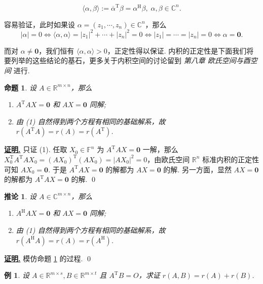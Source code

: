 \documentclass[10pt,openany]{article}
\theoremstyle{thmstyle} %
\theoremstyle{defstyle} %
\newtheorem{corollary}[theorem]{推论}
\theoremstyle{prostyle} %
\newtheorem{proposition}[theorem]{命题}
\theoremstyle{exastyle}
\newtheorem{example}[theorem]{例}
\theoremstyle{remstyle}
\renewenvironment{proof}[1][证明]{\par\underline{\textbf{#1.}} \;\fangsong}{\qed\par}
\newcommand{\T}{^{\text{T}}}
\newcommand{\Her}{^{\text{H}}}
\newcommand{\F}{\mathbb{F}}
\newcommand{\C}{\mathbb{C}}
\newcommand{\R}{\mathbb{R}}
\newcommand{\mn}{^{m \times n}}
\begin{document}
\[ \langle \alpha,\beta \rangle:= \overline{\alpha}\T \beta= \alpha\Her \beta, \; \alpha,\beta \in \C^n. \]

容易验证，此时如果设 \( \alpha=(z_1,\cdots,z_n) \in \C^n \)，那么 
\[ |\alpha|=0 \Leftrightarrow \langle \alpha,\alpha \rangle=|z_1|^2+\cdots+|z_n|^2=0 \Leftrightarrow |z_1|=\cdots=|z_n|=0 \Leftrightarrow \alpha=\bm{0}. \]

而对 \( \alpha \neq \bm{0} \)，我们恒有 \( \langle \alpha,\alpha \rangle>0 \)，正定性得以保证. 内积的正定性是下面我们将要列举的这些结论的基石，更多关于内积空间的讨论留到 \emph{第八章 欧氏空间与酉空间} 进行.


\begin{proposition} \label{5.3.9}
	设 \( A \in \R\mn \)，那么
	\begin{enumerate}[(1)]
		\item \( A\T AX=\bm{0} \) 和 \( AX=\bm{0} \) 同解;
		\item 由 (1) 自然得到两个方程有相同的基础解系，故 \( r(A\T A)=r(A)=r(A\T) \).
	\end{enumerate}
\end{proposition}


\begin{proof}
	只证 (1). 任取 \( X_0 \in \F^n \) 为 \( A\T AX=\bm{0} \) 一解，那么 \( X_0\T A\T AX_0=(AX_0)\T (AX_0)=|AX_0|^2=0 \)，由欧氏空间 \( \R^n \) 标准内积的正定性可知 \( AX_0=\bm{0} \). 于是 \( A\T AX=\bm{0} \) 的解都为 \( AX=\bm{0} \) 的解. 另一方面，显然 \( AX=\bm{0} \) 的解都为 \( A\T AX=\bm{0} \) 的解.
\end{proof}


\begin{corollary} \label{5.3.10}
	设 \( A \in \C\mn \)，那么
	\begin{enumerate}[(1)]
		\item \( A\Her AX=\bm{0} \) 和 \( AX=\bm{0} \) 同解;
		\item 由 (1) 自然得到两个方程有相同的基础解系，故 \( r(A\Her A)=r(A)=r(A\Her) \).
	\end{enumerate}
\end{corollary}

\begin{proof}
	模仿命题 \ref{5.3.9} 的过程.
\end{proof}

\begin{example} \label{5.3.11}
	设 \( A \in \R^{m \times s}, B \in \R^{m \times t} \) 且 \( A\T B=O \)，求证 \( r(A,B)=r(A)+r(B) \).
\end{example}
\end{document}
